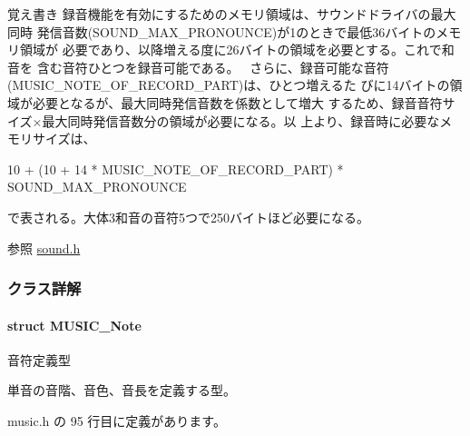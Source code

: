 \begin{DoxyNote}{覚え書き}
録音機能を有効にするためのメモリ領域は、サウンドドライバの最大同時 発信音数(\+S\+O\+U\+N\+D\+\_\+\+M\+A\+X\+\_\+\+P\+R\+O\+N\+O\+U\+N\+C\+E)が1のときで最低36バイトのメモリ領域が 必要であり、以降増える度に26バイトの領域を必要とする。これで和音を 含む音符ひとつを録音可能である。~\newline
さらに、録音可能な音符(\+M\+U\+S\+I\+C\+\_\+\+N\+O\+T\+E\+\_\+\+O\+F\+\_\+\+R\+E\+C\+O\+R\+D\+\_\+\+P\+A\+R\+T)は、ひとつ増えるた びに14バイトの領域が必要となるが、最大同時発信音数を係数として増大 するため、録音音符サイズ×最大同時発信音数分の領域が必要になる。以 上より、録音時に必要なメモリサイズは、
\end{DoxyNote}
\begin{DoxyParagraph}{}

\begin{DoxyCode}
10 + (10 + 14 * MUSIC\_NOTE\_OF\_RECORD\_PART) * SOUND_MAX_PRONOUNCE
\end{DoxyCode}

\end{DoxyParagraph}
\begin{DoxyParagraph}{}
で表される。大体3和音の音符5つで250バイトほど必要になる。~\newline
 
\end{DoxyParagraph}
\begin{DoxySeeAlso}{参照}
\hyperlink{sound_8h}{sound.\+h}
\end{DoxySeeAlso}
 

\subsubsection{クラス詳解}
\label{structMUSIC__Note}
\paragraph{struct M\+U\+S\+I\+C\+\_\+\+Note}
音符定義型 

単音の音階、音色、音長を定義する型。 

 music.\+h の 95 行目に定義があります。



